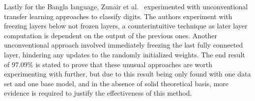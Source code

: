 \documentclass[english,twoside,openright]{UH_DS_MSc}
\begin{document}



Lastly for the Bangla language, Zunair et al.~\cite{11zunairUnconventionalWisdom} experimented 
with unconventional transfer learning approaches to classify digits.
The authors experiment with freezing layers below not frozen layers, a counterintuitive 
technique as later layer computation is dependent on the output of the previous ones.
Another unconventional approach involved immediately freezing the last fully connected layer, 
hindering any updates to the randomly initialized weights. The end result of 97.09\% is stated 
to prove that these unusual approaches are worth experimenting with further, but due to this 
result being only found with one data set and one base model, and in the absence of solid 
theoretical basis, more evidence is required to justify the effectiveness of this method.


\end{document}
